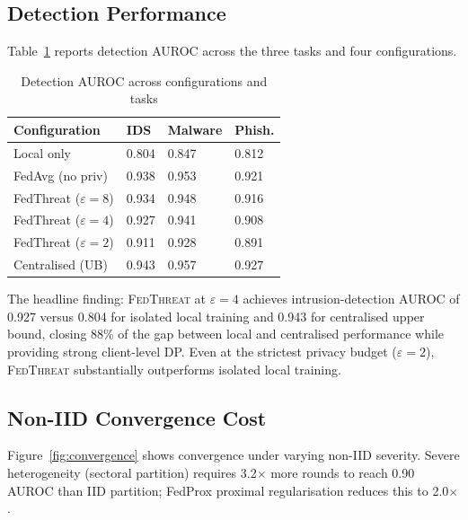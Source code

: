 \documentclass[sigconf,nonacm]{acmart}
\begin{document}
\subsection{Detection Performance}

Table~\ref{tab:detection} reports detection AUROC across the three tasks
and four configurations.

\begin{table}[h]
\caption{Detection AUROC across configurations and tasks}
\label{tab:detection}
\small
\begin{tabularx}{\columnwidth}{@{}p{2.4cm}*{3}{X}@{}}
\toprule
\textbf{Configuration} & \textbf{IDS} & \textbf{Malware} & \textbf{Phish.} \\
\midrule
Local only        & 0.804 & 0.847 & 0.812 \\
FedAvg (no priv)  & 0.938 & 0.953 & 0.921 \\
FedThreat ($\varepsilon=8$) & 0.934 & 0.948 & 0.916 \\
FedThreat ($\varepsilon=4$) & 0.927 & 0.941 & 0.908 \\
FedThreat ($\varepsilon=2$) & 0.911 & 0.928 & 0.891 \\
Centralised (UB)  & 0.943 & 0.957 & 0.927 \\
\bottomrule
\end{tabularx}
\end{table}

The headline finding: \textsc{FedThreat} at $\varepsilon=4$ achieves
intrusion-detection AUROC of 0.927 versus 0.804 for isolated local
training and 0.943 for centralised upper bound, closing 88\% of the gap
between local and centralised performance while providing strong client-level
DP. Even at the strictest privacy budget ($\varepsilon=2$), \textsc{FedThreat}
substantially outperforms isolated local training.

\subsection{Non-IID Convergence Cost}

Figure~\ref{fig:convergence} shows convergence under varying non-IID
severity. Severe heterogeneity (sectoral partition) requires
3.2$\times$ more rounds to reach 0.90 AUROC than IID partition; FedProx
proximal regularisation reduces this to 2.0$\times$.
\end{document}
